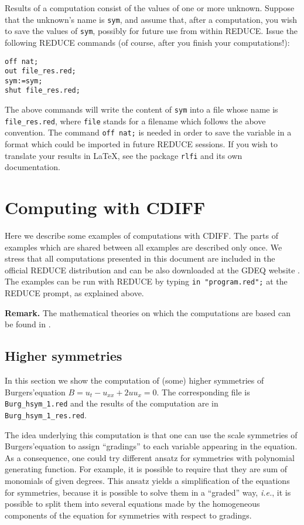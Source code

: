 \documentclass[12pt]{amsart}
\theoremstyle{definition}
\newcommand{\cdiff}{CDIFF\xspace}
\newcommand{\reduce}{REDUCE\xspace}
\begin{document}
Results of a computation consist of the values of one or more unknown. Suppose
that the unknown's name is \texttt{sym}, and assume that, after a computation,
you wish to save the values of \texttt{sym}, possibly for future use from within
\reduce. Issue the following \reduce commands (of course, after you finish your
computations!):
\begin{verbatim}
off nat;
out file_res.red;
sym:=sym;
shut file_res.red;
\end{verbatim}
The above commands will write the content of \texttt{sym} into a file whose
name is \texttt{file\_res.red}, where \texttt{file} stands for a filename which
follows the above convention. The command \texttt{off nat;} is needed in order
to save the variable in a format which could be imported in future \reduce
sessions. If you wish to translate your results in \LaTeX, see the package
\texttt{rlfi} and its own documentation.

\section{Computing with \cdiff}

Here we describe some examples of computations with \cdiff. The parts of
examples which are shared between all examples are described only once. We
stress that all computations presented in this document are included in the
official \reduce distribution and can be also downloaded at the GDEQ website
\cite{gdeq}. The examples can be run with \reduce by typing \texttt{in
  "program.red";} at the \reduce prompt, as explained above.

\textbf{Remark.} The mathematical theories on which the computations are based
can be found in \cite{Many,KKV}.

\subsection{Higher symmetries}\label{sec:higher-symmetries}

In this section we show the computation of (some) higher symmetries of
Burgers'equation $B=u_t-u_{xx}+2uu_x=0$. The corresponding file is
\texttt{Burg\_hsym\_1.red} and the results of the computation are in
\texttt{Burg\_hsym\_1\_res.red}.

The idea underlying this computation is that one can use the scale symmetries
of Burgers'equation to assign ``gradings'' to each variable appearing in the
equation. As a consequence, one could try different ansatz for symmetries with
polynomial generating function. For example, it is possible to require that
they are sum of monomials of given degrees. This ansatz yields a simplification
of the equations for symmetries, because it is possible to solve them in a
``graded'' way, \emph{i.e.}, it is possible to split them into several
equations made by the homogeneous components of the equation for symmetries
with respect to gradings.
\end{document}
